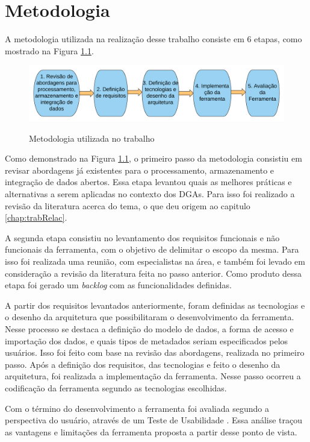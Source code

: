 
\chapter{Metodologia}
\label{chap:metodologia}

A metodologia utilizada na realização desse trabalho consiste em 6 etapas, 
como mostrado na Figura \ref{fig:metodologia}.

\begin{figure}[!htb]
    \centering
    \caption{Metodologia utilizada no trabalho}
    \includegraphics[width=1\textwidth]{./04-figuras/metodologia}
    \label{fig:metodologia}
\end{figure}


Como demonstrado na Figura \ref{fig:metodologia}, o primeiro passo da metodologia consistiu 
em revisar abordagens já existentes para o processamento, armazenamento e integração de dados abertos. 
Essa etapa levantou quais as melhores práticas e alternativas a serem aplicadas no contexto dos 
DGAs. Para isso foi realizado a revisão da literatura acerca do tema, o que deu origem ao 
capitulo \ref{chap:trabRelac}.

A segunda etapa consistiu no levantamento dos requisitos funcionais e não funcionais da 
ferramenta, com o objetivo de delimitar o escopo da mesma. Para isso foi realizada uma reunião,
com especialistas na área, e também foi levado em consideração a revisão da literatura 
feita no passo anterior. Como produto dessa etapa foi gerado um \textit{backlog} com as 
funcionalidades definidas.

A partir dos requisitos levantados anteriormente, foram definidas as tecnologias e o desenho 
da arquitetura que possibilitaram o desenvolvimento da ferramenta. Nesse processo se destaca 
a definição do modelo de dados, a forma de acesso e importação dos dados, e quais tipos de 
metadados seriam especificados pelos usuários. Isso foi feito com base na revisão das 
abordagens, realizada no primeiro passo. Após a definição dos requisitos, das tecnologias e 
feito o desenho da arquitetura, foi realizada a implementação da ferramenta. Nesse passo 
ocorreu a codificação da ferramenta segundo as tecnologias escolhidas. 

Com o término do desenvolvimento a ferramenta foi avaliada segundo a perspectiva do usuário,
através de um Teste de Usabilidade \cite{barbosa2010}. Essa análise traçou as vantagens e 
limitações da ferramenta proposta a partir desse ponto de vista.
